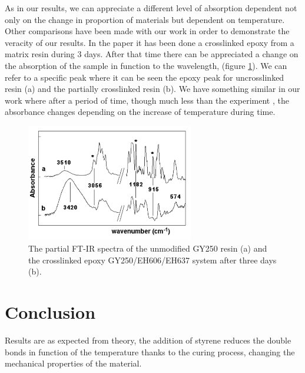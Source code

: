 As in our results, we can appreciate a different level of absorption dependent
not only on the change in proportion of materials but dependent on temperature.\\

Other comparisons have been made with our work in order to demonstrate the veracity
of our results. In the paper \cite{Nikolic2010} it has been done a crosslinked epoxy from a matrix
resin during 3 days. After that time there can be appreciated a change on the absorption
of the sample in function to the wavelength, (figure \ref{fig:epoxy}). We can refer to a specific
peak where it can be seen the epoxy peak for uncrosslinked resin (a) and the partially
crosslinked resin (b). We have something similar in our work where after a period
of time, though much less than the experiment \cite{Nikolic2010}, the absorbance changes depending
on the increase of temperature during time.\\

\begin{figure}[h]
	\centering
	\includegraphics[width=0.65\textwidth]{img/crosslinked_epoxy.png}
	\caption{The partial FT-IR spectra of the unmodified GY250 resin (a) and the crosslinked
epoxy GY250/EH606/EH637 system after three days (b).}
	\label{fig:epoxy}
\end{figure}

\newpage

\vspace*{1px}

\section{Conclusion}

Results are as expected from theory, the addition of styrene reduces the double
bonds in function of the temperature thanks to the curing process, changing the
mechanical properties of the material.\\
